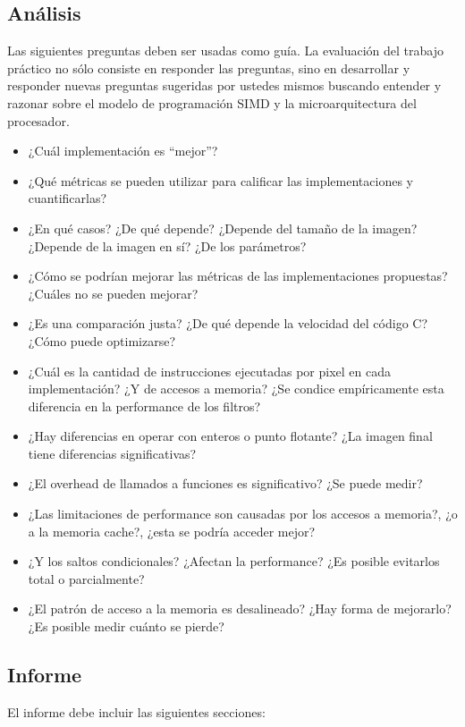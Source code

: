 \documentclass[a4paper, 12pt]{article}
\begin{document}
\subsection{Análisis}

Las siguientes preguntas deben ser usadas como guía.
La evaluación del trabajo práctico no sólo consiste en responder
las preguntas, sino en desarrollar y responder nuevas preguntas
sugeridas por ustedes mismos buscando entender y razonar sobre
el modelo de programación SIMD y la microarquitectura del procesador.


\begin{itemize}
\item ¿Cuál implementación es ``mejor''?
\item ¿Qué métricas se pueden utilizar para calificar las implementaciones y cuantificarlas?
\item ¿En qué casos? ¿De qué depende? ¿Depende del tamaño de la imagen? ¿Depende de la imagen en sí? ¿De los parámetros?
\item ¿Cómo se podrían mejorar las métricas de las implementaciones propuestas? ¿Cuáles no se pueden mejorar?
\item ¿Es una comparación justa? ¿De qué depende la velocidad del
código C? ¿Cómo puede optimizarse?
\item ¿Cuál es la cantidad de instrucciones ejecutadas por pixel en cada implementación? ¿Y de accesos a memoria? ¿Se condice empíricamente esta diferencia en la performance de los filtros?
\item ¿Hay diferencias en operar con enteros o punto flotante? ¿La imagen final tiene diferencias significativas?
\item ¿El overhead de llamados a funciones es significativo? ¿Se puede medir?
\item ¿Las limitaciones de performance son causadas por los accesos a memoria?, ¿o a la memoria cache?, ¿esta se podría acceder mejor?
\item ¿Y los saltos condicionales? ¿Afectan la performance? ¿Es posible evitarlos total o parcialmente?
\item ¿El patrón de acceso a la memoria es desalineado? ¿Hay forma de mejorarlo? ¿Es posible medir cuánto se pierde?
\end{itemize}


\subsection{Informe}

El informe debe incluir las siguientes secciones:
\end{document}
